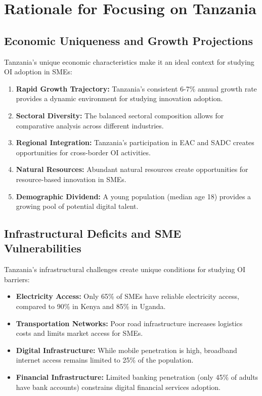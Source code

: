\section{Rationale for Focusing on Tanzania}

\subsection{Economic Uniqueness and Growth Projections}

Tanzania's unique economic characteristics make it an ideal context for studying OI adoption in SMEs:

\begin{enumerate}
    \item \textbf{Rapid Growth Trajectory:} Tanzania's consistent 6-7\% annual growth rate provides a dynamic environment for studying innovation adoption.
    \item \textbf{Sectoral Diversity:} The balanced sectoral composition allows for comparative analysis across different industries.
    \item \textbf{Regional Integration:} Tanzania's participation in EAC and SADC creates opportunities for cross-border OI activities.
    \item \textbf{Natural Resources:} Abundant natural resources create opportunities for resource-based innovation in SMEs.
    \item \textbf{Demographic Dividend:} A young population (median age 18) provides a growing pool of potential digital talent.
\end{enumerate}

\subsection{Infrastructural Deficits and SME Vulnerabilities}

Tanzania's infrastructural challenges create unique conditions for studying OI barriers:

\begin{itemize}
    \item \textbf{Electricity Access:} Only 65\% of SMEs have reliable electricity access, compared to 90\% in Kenya and 85\% in Uganda.
    \item \textbf{Transportation Networks:} Poor road infrastructure increases logistics costs and limits market access for SMEs.
    \item \textbf{Digital Infrastructure:} While mobile penetration is high, broadband internet access remains limited to 25\% of the population.
    \item \textbf{Financial Infrastructure:} Limited banking penetration (only 45\% of adults have bank accounts) constrains digital financial services adoption.
\end{itemize}

